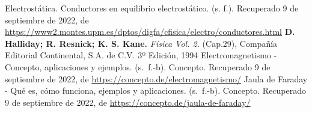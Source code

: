 \documentclass[]{article}
\begin{document}
\begin{thebibliography}{5}
      Electrostática. Conductores en equilibrio electrostático. (s. f.). Recuperado 9 de septiembre de 2022, 
    de \url{https://www2.montes.upm.es/dptos/digfa/cfisica/electro/conductores.html}
     \textbf{D. Halliday; R. Resnick; K. S. Kane.} \textit{Física Vol. 2.} (Cap.29), Compañía Editorial Continental, S.A. de C.V. 3º Edición, 1994
    Electromagnetismo - Concepto, aplicaciones y ejemplos. (s. f.-b). Concepto. Recuperado 9 de septiembre de 2022,
     de \url{https://concepto.de/electromagnetismo/}
    Jaula de Faraday - Qué es, cómo funciona, ejemplos y aplicaciones. (s. f.-b). Concepto. Recuperado 9 de septiembre de 2022, 
    de \url{https://concepto.de/jaula-de-faraday/}
\end{thebibliography}
\end{document}
